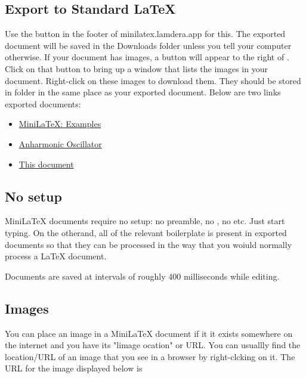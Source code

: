 \subsection{Export to Standard LaTeX}

Use the  button in the footer of minilatex.lamdera.app for this.  The exported document will be saved in the Downloads folder unless you tell your computer otherwise.  If your document has images, a button  will appear to the right of .  Click on that button to bring up a window that lists the images in your document.  Right-click on these images to download them.  They should be stored in folder  in the same place as your exported document.  Below are two links  exported documents:


\begin{itemize}


\item \href{https://noteimages.s3.amazonaws.com/Minilatex__Examples.pdf}{MiniLaTeX: Examples}

\item \href{https://noteimages.s3.amazonaws.com/anharmonic_oscillator.pdf}{Anharmonic Oscillator}

\item \href{https://noteimages.s3.amazonaws.com/TUG_Talk_July_2020.pdf}{This document}

\end{itemize}


\subsection{No setup}

MiniLaTeX documents require no setup: no preamble, no , no  etc.  Just start typing. On the otherand, all of the relevant boilerplate is present in exported documents so that they can be processed in the way that you woiuld normally process a LaTeX document.

Documents are saved at intervals of roughly 400 milliseconds while editing.

\subsection{Images}

You can place an image in a MiniLaTeX document if it it exists somewhere on the internet and you have its "limage ocation" or URL.  You can usuallly find the location/URL of an image that you see in a browser  by right-clcking on it. The URL for the image displayed below is

